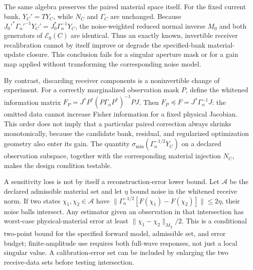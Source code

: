 The same algebra preserves the paired material space itself. For the fixed current bank, \(Y_C'=TY_C\), while \(N_C\) and \(\Gamma_C\) are unchanged. Because \(J_0'^*\Gamma_n'^{-1}Y_C'=J_0^*\Gamma_n^{-1}Y_C\), the noise-weighted reduced normal inverse \(M_0\) and both generators of \(\mathcal E_0(C)\) are identical. Thus an exactly known, invertible receiver recalibration cannot by itself improve or degrade the specified-bank material-update closure. This conclusion fails for a singular aperture mask or for a gain map applied without transforming the corresponding noise model.

By contrast, discarding receiver components is a noninvertible change of experiment. For a correctly marginalized observation mask \(P\), define the whitened information matrix \(F_P=J^*P^*(P\Gamma_nP^*)^{-1}PJ\). Then \(F_P\preceq F=J^*\Gamma_n^{-1}J\): the omitted data cannot increase Fisher information for a fixed physical Jacobian. This order does not imply that a particular paired correction always shrinks monotonically, because the candidate bank, residual, and regularized optimization geometry also enter its gain. The quantity \(\sigma_{\min}(\Gamma_n^{-1/2}Y_C)\) on a declared observation subspace, together with the corresponding material injection \(N_C\), makes the design condition testable.

A sensitivity loss is not by itself a reconstruction-error lower bound. Let \(\mathcal A\) be the declared admissible material set and let \(\eta\) bound noise in the whitened receive norm. If two states \(\chi_1,\chi_2\in\mathcal A\) have \(\|\Gamma_n^{-1/2}[F(\chi_1)-F(\chi_2)]\|\le2\eta\), their noise balls intersect. Any estimator given an observation in that intersection has worst-case physical-material error at least \(\|\chi_1-\chi_2\|_{M_\chi}/2\). This is a conditional two-point bound for the specified forward model, admissible set, and error budget; finite-amplitude use requires both full-wave responses, not just a local singular value. A calibration-error set can be included by enlarging the two receive-data sets before testing intersection.

